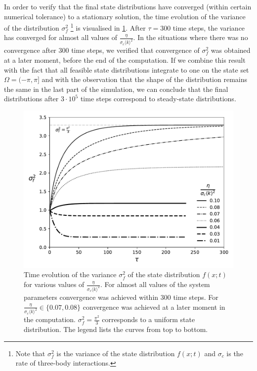 In order to verify that the final state distributions have converged (within certain numerical tolerance) to a stationary solution, the time evolution of the variance of the distribution $\sigma_f^2$ \footnote{Note that $\sigma_f^2$ is the variance of the state distribution $f(x;t)$ and $\sigma_c$ is the rate of three-body interactions.} is visualised in \cref{fig:cont_mean_field_var_vs_t}. After $\tau=300$ time steps, the variance has converged for almost all values of $\frac{\eta}{\sigma_c\langle k \rangle^2}$. In the situations where there was no convergence after 300 time steps, we verified that convergence of $\sigma_f^2$ was obtained at a later moment, before the end of the computation. If we combine this result with the fact that all feasible state distributions integrate to one on the state set $\Omega = (-\pi,\pi]$ and with the observation that the shape of the distribution remains the same in the last part of the simulation, we can conclude that the final distributions after $3\cdot 10^5$ time steps correspond to steady-state distributions. 

\begin{figure}[tbp]
	\centering
	\includegraphics[width=0.7\linewidth]{figures/cont_mean_field_var_vs_t_BW}
	\caption{Time evolution of the variance $\sigma_f^2$ of the state distribution $f(x;t)$ for various values of $\frac{\eta}{\sigma_c\langle k \rangle^2}$. For almost all values of the system parameters convergence was achieved within 300 time steps. For $\frac{\eta}{\sigma_c\langle k \rangle^2} \in \{0.07, 0.08\}$ convergence was achieved at a later moment in the computation. $\sigma_f^2 = \frac{\pi^2}{3}$ corresponds to a uniform state distribution. The legend lists the curves from top to bottom. }
	\label{fig:cont_mean_field_var_vs_t}
\end{figure}

